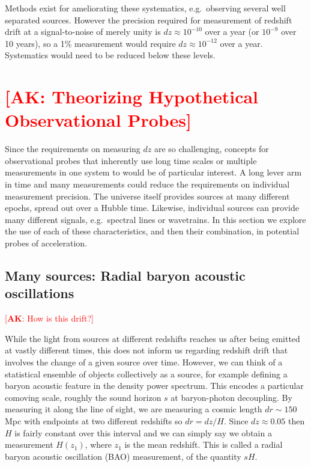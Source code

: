 \documentclass[preprint2, 10pt]{aastex}
\newcommand{\alex}[1]{\textcolor{red}{[{\bf AK}: #1]}}
\begin{document}
Methods exist for ameliorating these systematics, e.g.\ observing several 
well separated sources.  However the precision required for measurement of 
redshift drift at a signal-to-noise of merely unity is 
$dz\approx 10^{-10}$ over a year (or $10^{-9}$ over 10 years), 
so a 1\% measurement would require $dz\approx 10^{-12}$ over a year.  
Systematics would need to be reduced below these levels. 


\section{\alex{Theorizing Hypothetical Observational Probes}} \label{sec:methods} 

Since the requirements on measuring $dz$ are so challenging, 
concepts for observational probes that inherently use long time scales or 
multiple measurements in one system to  would be of particular interest. 
A long lever arm in time and many measurements could reduce the requirements 
on individual measurement precision.  The universe itself provides sources 
at many different epochs, spread out over a Hubble time.  Likewise, 
individual sources can provide many different signals, e.g.\ spectral lines 
or wavetrains.  In this section we explore the use of each of these 
characteristics, and then their combination, in potential probes of 
acceleration. 


\subsection{Many sources: Radial baryon acoustic oscillations} \label{sec:rbao} 

\alex{How is this drift?}

While the light from sources at different redshifts reaches us after 
being emitted at vastly different times, this does not inform us regarding 
redshift drift that involves the change of a given source over time.  
However, we can think of a statistical ensemble of objects collectively as 
a source, for example 
defining a baryon acoustic feature in the density power spectrum.  This 
encodes a particular comoving scale, roughly the sound horizon $s$ at 
baryon-photon decoupling.  By measuring it along the line of sight, we 
are measuring a cosmic length $dr\sim150$ Mpc with endpoints at two 
different redshifts so $dr=dz/H$.  Since $dz\approx0.05$ then $H$ is 
fairly constant over this interval and we can simply say we obtain a 
measurement $H(z_1)$, where $z_1$ is the mean redshift.  This is called a 
radial baryon acoustic oscillation (BAO) measurement, of the quantity 
$sH$. 
\end{document}
